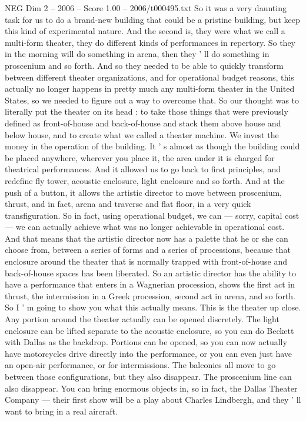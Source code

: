 \begin{textsample}{NEG Dim 2 – 2006 – Score 1.00 – 2006/t000495.txt}
So it was a very daunting task for us to do a brand-new building that could be a pristine building, but keep this kind of experimental nature.
And the second is, they were what we call a multi-form theater, they do different kinds of performances in repertory.
So they in the morning will do something in arena, then they ' ll do something in proscenium and so forth.
And so they needed to be able to quickly transform between different theater organizations, and for operational budget reasons, this actually no longer happens in pretty much any multi-form theater in the United States, so we needed to figure out a way to overcome that.
So our thought was to literally put the theater on its head : to take those things that were previously defined as front-of-house and back-of-house and stack them above house and below house, and to create what we called a theater machine.
We invest the money in the operation of the building.
It ' s almost as though the building could be placed anywhere, wherever you place it, the area under it is charged for theatrical performances.
And it allowed us to go back to first principles, and redefine fly tower, acoustic enclosure, light enclosure and so forth.
And at the push of a button, it allows the artistic director to move between proscenium, thrust, and in fact, arena and traverse and flat floor, in a very quick transfiguration.
So in fact, using operational budget, we can — sorry, capital cost — we can actually achieve what was no longer achievable in operational cost.
And that means that the artistic director now has a palette that he or she can choose from, between a series of forms and a series of processions, because that enclosure around the theater that is normally trapped with front-of-house and back-of-house spaces has been liberated.
So an artistic director has the ability to have a performance that enters in a Wagnerian procession, shows the first act in thrust, the intermission in a Greek procession, second act in arena, and so forth.
So I ' m going to show you what this actually means.
This is the theater up close.
Any portion around the theater actually can be opened discretely.
The light enclosure can be lifted separate to the acoustic enclosure, so you can do Beckett with Dallas as the backdrop.
Portions can be opened, so you can now actually have motorcycles drive directly into the performance, or you can even just have an open-air performance, or for intermissions.
The balconies all move to go between those configurations, but they also disappear.
The proscenium line can also disappear.
You can bring enormous objects in, so in fact, the Dallas Theater Company — their first show will be a play about Charles Lindbergh, and they ' ll want to bring in a real aircraft.

\end{textsample}
